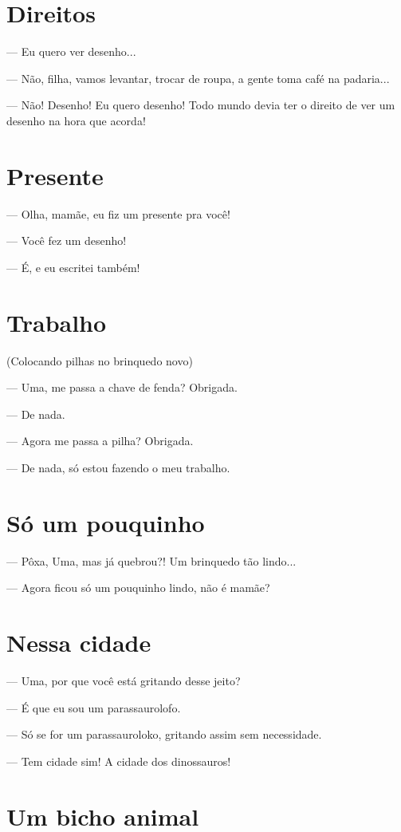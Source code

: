 {\chapter{Direitos}

— Eu quero ver desenho...

— Não, filha, vamos levantar, trocar de roupa, a gente toma café na
padaria...

— Não! Desenho! Eu quero desenho! Todo mundo devia ter o direito de ver
um desenho na hora que acorda!

\chapter{Presente}

— Olha, mamãe, eu fiz um presente pra você!

— Você fez um desenho!

— É, e eu escritei também!

\chapter{Trabalho}

(Colocando pilhas no brinquedo novo)

— Uma, me passa a chave de fenda? Obrigada.

— De nada.

— Agora me passa a pilha? Obrigada.

— De nada, só estou fazendo o meu trabalho.

\chapter{Só um pouquinho}

— Pôxa, Uma, mas já quebrou?! Um brinquedo tão lindo...

— Agora ficou só um pouquinho lindo, não é mamãe?

\chapter{Nessa cidade}

— Uma, por que você está gritando desse jeito?

— É que eu sou um parassaurolofo.

— Só se for um parassauroloko, gritando assim sem necessidade.

— Tem cidade sim! A cidade dos dinossauros!

\chapter{Um bicho animal}

}
